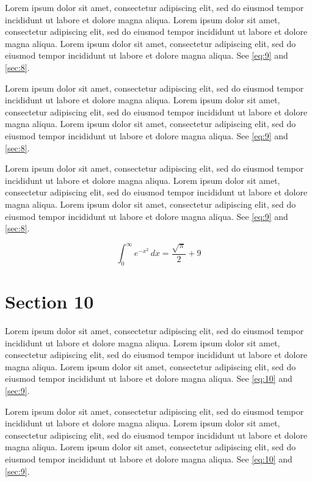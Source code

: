 \documentclass[11pt]{article}
\begin{document}
Lorem ipsum dolor sit amet, consectetur adipiscing elit, sed do eiusmod tempor incididunt ut labore et dolore magna aliqua. Lorem ipsum dolor sit amet, consectetur adipiscing elit, sed do eiusmod tempor incididunt ut labore et dolore magna aliqua. Lorem ipsum dolor sit amet, consectetur adipiscing elit, sed do eiusmod tempor incididunt ut labore et dolore magna aliqua. See \cref{eq:9} and \cref{sec:8}.

Lorem ipsum dolor sit amet, consectetur adipiscing elit, sed do eiusmod tempor incididunt ut labore et dolore magna aliqua. Lorem ipsum dolor sit amet, consectetur adipiscing elit, sed do eiusmod tempor incididunt ut labore et dolore magna aliqua. Lorem ipsum dolor sit amet, consectetur adipiscing elit, sed do eiusmod tempor incididunt ut labore et dolore magna aliqua. See \cref{eq:9} and \cref{sec:8}.

Lorem ipsum dolor sit amet, consectetur adipiscing elit, sed do eiusmod tempor incididunt ut labore et dolore magna aliqua. Lorem ipsum dolor sit amet, consectetur adipiscing elit, sed do eiusmod tempor incididunt ut labore et dolore magna aliqua. Lorem ipsum dolor sit amet, consectetur adipiscing elit, sed do eiusmod tempor incididunt ut labore et dolore magna aliqua. See \cref{eq:9} and \cref{sec:8}.

\begin{equation}\label{eq:9} \int_0^\infty e^{-x^2}\,dx = \frac{\sqrt{\pi}}{2} + 9\end{equation}
\section{Section 10}\label{sec:10}
Lorem ipsum dolor sit amet, consectetur adipiscing elit, sed do eiusmod tempor incididunt ut labore et dolore magna aliqua. Lorem ipsum dolor sit amet, consectetur adipiscing elit, sed do eiusmod tempor incididunt ut labore et dolore magna aliqua. Lorem ipsum dolor sit amet, consectetur adipiscing elit, sed do eiusmod tempor incididunt ut labore et dolore magna aliqua. See \cref{eq:10} and \cref{sec:9}.

Lorem ipsum dolor sit amet, consectetur adipiscing elit, sed do eiusmod tempor incididunt ut labore et dolore magna aliqua. Lorem ipsum dolor sit amet, consectetur adipiscing elit, sed do eiusmod tempor incididunt ut labore et dolore magna aliqua. Lorem ipsum dolor sit amet, consectetur adipiscing elit, sed do eiusmod tempor incididunt ut labore et dolore magna aliqua. See \cref{eq:10} and \cref{sec:9}.
\end{document}
